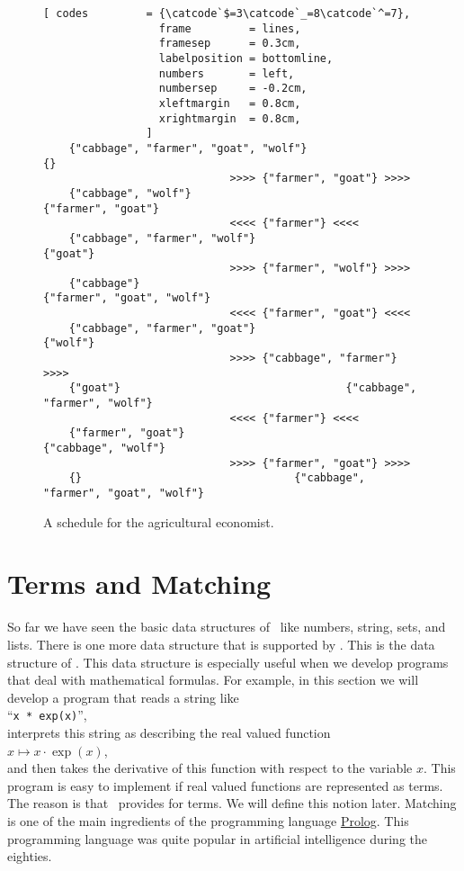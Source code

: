 \begin{figure}[!ht]
  \centering
\begin{Verbatim}[ codes         = {\catcode`$=3\catcode`_=8\catcode`^=7},
                  frame         = lines, 
                  framesep      = 0.3cm, 
                  labelposition = bottomline,
                  numbers       = left,
                  numbersep     = -0.2cm,
                  xleftmargin   = 0.8cm,
                  xrightmargin  = 0.8cm,
                ]
    {"cabbage", "farmer", "goat", "wolf"}                                 {}
                             >>>> {"farmer", "goat"} >>>> 
    {"cabbage", "wolf"}                                   {"farmer", "goat"}
                             <<<< {"farmer"} <<<< 
    {"cabbage", "farmer", "wolf"}                                   {"goat"}
                             >>>> {"farmer", "wolf"} >>>> 
    {"cabbage"}                                   {"farmer", "goat", "wolf"}
                             <<<< {"farmer", "goat"} <<<< 
    {"cabbage", "farmer", "goat"}                                   {"wolf"}
                             >>>> {"cabbage", "farmer"} >>>> 
    {"goat"}                                   {"cabbage", "farmer", "wolf"}
                             <<<< {"farmer"} <<<< 
    {"farmer", "goat"}                                   {"cabbage", "wolf"}
                             >>>> {"farmer", "goat"} >>>> 
    {}                                 {"cabbage", "farmer", "goat", "wolf"}
\end{Verbatim} 
\vspace*{-0.3cm}
\caption{A schedule for the agricultural economist.}  
\label{fig:wolf-ziege-solution}
\end{figure}


\section{Terms and Matching}
So far we have seen the basic data structures of \setlx\ like numbers, string, sets, and lists.
There is one more data structure that is supported by \setlx.  This is the data structure of
\colorbox{amethyst}{}.  
This data structure is especially useful when we develop programs that deal with mathematical formulas.
For example, in this section we will develop a program that reads a string like 
\\[0.2cm]
\hspace*{1.3cm}
``\texttt{x * exp(x)}'',
\\[0.2cm]
interprets this string as describing the real valued function 
\\[0.2cm]
\hspace*{1.3cm}
$x \mapsto x \cdot \exp(x)$, 
\\[0.2cm]
and then takes the derivative of this function with respect to the variable $x$.  This program is
easy to implement if real valued functions are represented as terms.  The reason is that \setlx\ provides 
\colorbox{amethyst}{} for terms.  We will define this notion later.  Matching
is one of the main ingredients of the programming language \href{https://en.wikipedia.org/wiki/Prolog}{Prolog}.
This programming language was quite popular in artificial intelligence during the eighties.


